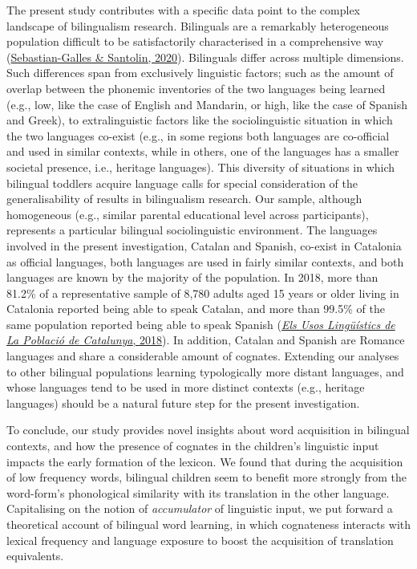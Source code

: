 \documentclass[
]{article}
\begin{document}
The present study contributes with a specific data point to the complex
landscape of bilingualism research. Bilinguals are a remarkably
heterogeneous population difficult to be satisfactorily characterised in
a comprehensive way
(\protect\hyperlink{ref-sebastian-galles2020bilingual}{Sebastian-Galles
\& Santolin, 2020}). Bilinguals differ across multiple dimensions. Such
differences span from exclusively linguistic factors; such as the amount
of overlap between the phonemic inventories of the two languages being
learned (e.g., low, like the case of English and Mandarin, or high, like
the case of Spanish and Greek), to extralinguistic factors like the
sociolinguistic situation in which the two languages co-exist (e.g., in
some regions both languages are co-official and used in similar
contexts, while in others, one of the languages has a smaller societal
presence, i.e., heritage languages). This diversity of situations in
which bilingual toddlers acquire language calls for special
consideration of the generalisability of results in bilingualism
research. Our sample, although homogeneous (e.g., similar parental
educational level across participants), represents a particular
bilingual sociolinguistic environment. The languages involved in the
present investigation, Catalan and Spanish, co-exist in Catalonia as
official languages, both languages are used in fairly similar contexts,
and both languages are known by the majority of the population. In 2018,
more than 81.2\% of a representative sample of 8,780 adults aged 15
years or older living in Catalonia reported being able to speak Catalan,
and more than 99.5\% of the same population reported being able to speak
Spanish (\protect\hyperlink{ref-2018els}{\emph{Els Usos Lingüístics de
La Població de Catalunya}, 2018}). In addition, Catalan and Spanish are
Romance languages and share a considerable amount of cognates. Extending
our analyses to other bilingual populations learning typologically more
distant languages, and whose languages tend to be used in more distinct
contexts (e.g., heritage languages) should be a natural future step for
the present investigation.

To conclude, our study provides novel insights about word acquisition in
bilingual contexts, and how the presence of cognates in the children's
linguistic input impacts the early formation of the lexicon. We found
that during the acquisition of low frequency words, bilingual children
seem to benefit more strongly from the word-form's phonological
similarity with its translation in the other language. Capitalising on
the notion of \emph{accumulator} of linguistic input, we put forward a
theoretical account of bilingual word learning, in which cognateness
interacts with lexical frequency and language exposure to boost the
acquisition of translation equivalents.
\end{document}
